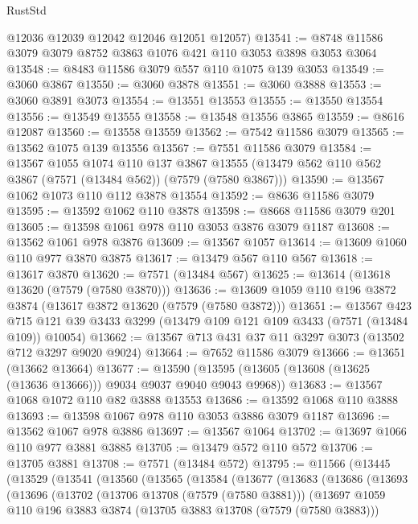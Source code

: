 \begin{lexlean}{RustStd}
\begin{coremodule}
{\begin{coremodule}
{{{{{{{{{{{{{{{{{{{{{{{{{{{{{{{{      @12036
      @12039
      @12042
      @12046
      @12051
      @12057)
@13541 := @8748 @11586 @3079 @3079 @8752 @3863 @1076 @421 @110 @3053 @3898 @3053 @3064
@13548 := @8483 @11586 @3079 @557 @110 @1075 @139 @3053
@13549 := @3060 @3867
@13550 := @3060 @3878
@13551 := @3060 @3888
@13553 := @3060 @3891 @3073
@13554 := @13551 @13553
@13555 := @13550 @13554
@13556 := @13549 @13555
@13558 := @13548 @13556 @3865
@13559 := @8616 @12087
@13560 := @13558 @13559
@13562 := @7542 @11586 @3079
@13565 := @13562 @1075 @139 @13556
@13567 := @7551 @11586 @3079
@13584 := @13567
    @1055
    @1074
    @110
    @137
    @3867
    @13555
    (@13479 @562 @110 @562 @3867 (@7571 (@13484 @562)) (@7579 (@7580 @3867)))
@13590 := @13567 @1062 @1073 @110 @112 @3878 @13554
@13592 := @8636 @11586 @3079
@13595 := @13592 @1062 @110 @3878
@13598 := @8668 @11586 @3079 @201
@13605 := @13598 @1061 @978 @110 @3053 @3876 @3079 @1187
@13608 := @13562 @1061 @978 @3876
@13609 := @13567 @1057
@13614 := @13609 @1060 @110 @977 @3870 @3875
@13617 := @13479 @567 @110 @567
@13618 := @13617 @3870
@13620 := @7571 (@13484 @567)
@13625 := @13614 (@13618 @13620 (@7579 (@7580 @3870)))
@13636 := @13609 @1059 @110 @196 @3872 @3874 (@13617 @3872 @13620 (@7579 (@7580 @3872)))
@13651 := @13567
    @423
    @715
    @121
    @39
    @3433
    @3299
    (@13479 @109 @121 @109 @3433 (@7571 (@13484 @109)) @10054)
@13662 := @13567 @713 @431 @37 @11 @3297 @3073 (@13502 @712 @3297 @9020 @9024)
@13664 := @7652 @11586 @3079
@13666 := @13651 (@13662 @13664)
@13677 := @13590 (@13595 (@13605 (@13608 (@13625 (@13636 @13666))) @9034 @9037 @9040 @9043 @9968))
@13683 := @13567 @1068 @1072 @110 @82 @3888 @13553
@13686 := @13592 @1068 @110 @3888
@13693 := @13598 @1067 @978 @110 @3053 @3886 @3079 @1187
@13696 := @13562 @1067 @978 @3886
@13697 := @13567 @1064
@13702 := @13697 @1066 @110 @977 @3881 @3885
@13705 := @13479 @572 @110 @572
@13706 := @13705 @3881
@13708 := @7571 (@13484 @572)
@13795 := @11566
    (@13445
      (@13529
        (@13541
          (@13560
            (@13565
              (@13584
                (@13677
                  (@13683
                    (@13686
                      (@13693
                        (@13696
                          (@13702
                            (@13706 @13708 (@7579 (@7580 @3881)))
                            (@13697
                              @1059
                              @110
                              @196
                              @3883
                              @3874
                              (@13705 @3883 @13708 (@7579 (@7580 @3883)))
}}}}}}}}}}}}}}}}}}}}}}}}}}}}}}}}
\end{coremodule}}
\end{coremodule}
\end{lexlean}
